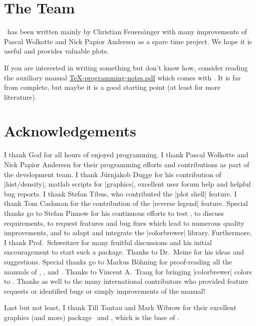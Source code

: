\section{The Team}
\PGFPlots\ has been written mainly by Christian Feuersänger with many improvements of Pascal Wolkotte and Nick Papior Andersen as a spare time project. We hope it is useful and provides valuable plots.

If you are interested in writing something but don't know how, consider reading the auxiliary manual \href{file:TeX-programming-notes.pdf}{TeX-programming-notes.pdf} which comes with \PGFPlots. It is far from complete, but maybe it is a good starting point (at least for more literature).

\section{Acknowledgements}
I thank God for all hours of enjoyed programming. I thank Pascal Wolkotte and Nick Papior Andersen for their programming efforts and contributions as part of the development team. I thank J\"urnjakob Dugge for his contribution of |hist/density|, matlab scripts for  |graphics|, excellent user forum help and helpful bug reports. I thank Stefan Tibus, who contributed the |plot shell| feature. I thank Tom Cashman for the contribution of the |reverse legend| feature. Special thanks go to Stefan Pinnow for his continuous efforts to test \PGFPlots, to discuss requirements, to request features and bug fixes which lead to numerous quality improvements, and to adapt and integrate the |colorbrewer| library. Furthermore, I thank Prof.~Schweitzer for many fruitful discussions and his initial encouragement to start such a package. Thanks to Dr.~Meine for his ideas and suggestions. Special thanks go to Markus B\"ohning for proof-reading all the manuals of \PGF, \PGFPlots, and \PGFPlotstable. Thanks to Vincent A.\ Traag for bringing |colorbrewer| colors to \PGFPlots. Thanks as well to the many international contributors who provided feature requests or identified bugs or simply improvements of the manual!

Last but not least, I thank Till Tantau and Mark Wibrow for their excellent graphics (and more) package \PGF\ and \Tikz, which is the base of \PGFPlots.



